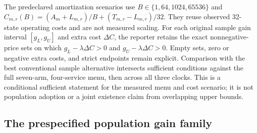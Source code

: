 The predeclared amortization scenarios use $B\in\{1,64,1024,65536\}$ and $C_{m,r}(B)=(A_m+L_{m,r})/B+(T_{m,r}-L_{m,r})/32$. They reuse observed 32-state operating costs and are not measured scaling. For each original sample gain interval $[g_L,g_U]$ and extra cost $\Delta C$, the reporter retains the exact nonnegative-price sets on which $g_L-\lambda\Delta C>0$ and $g_U-\lambda\Delta C>0$. Empty sets, zero or negative extra costs, and strict endpoints remain explicit. Comparison with the best conventional sample alternative intersects sufficient conditions against the full seven-arm, four-service menu, then across all three clocks. This is a conditional sufficient statement for the measured menu and cost scenario; it is not population adoption or a joint existence claim from overlapping upper bounds.

\subsection{The prespecified population gain family}\label{sec:populationresults120}

